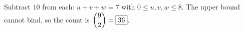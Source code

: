 Subtract $10$ from each: $u+v+w=7$ with $0\le u,v,w\le8$. The upper bound cannot bind, so the count is $\dbinom92=\boxed{36}$.
